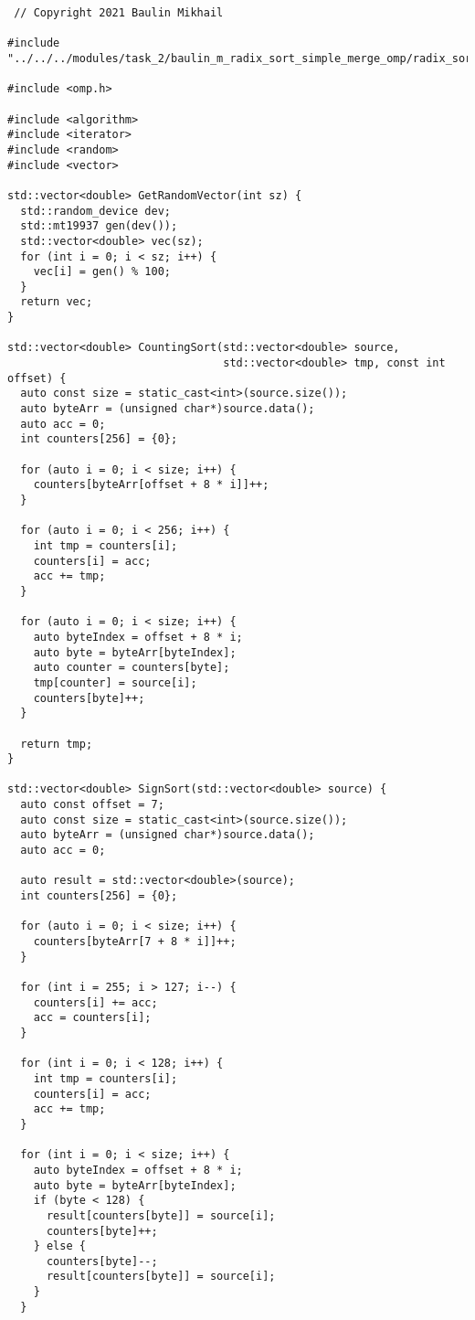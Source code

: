 \documentclass{report}
\begin{document}
    \begin{lstlisting}
 // Copyright 2021 Baulin Mikhail

#include "../../../modules/task_2/baulin_m_radix_sort_simple_merge_omp/radix_sort.h"

#include <omp.h>

#include <algorithm>
#include <iterator>
#include <random>
#include <vector>

std::vector<double> GetRandomVector(int sz) {
  std::random_device dev;
  std::mt19937 gen(dev());
  std::vector<double> vec(sz);
  for (int i = 0; i < sz; i++) {
    vec[i] = gen() % 100;
  }
  return vec;
}

std::vector<double> CountingSort(std::vector<double> source,
                                 std::vector<double> tmp, const int offset) {
  auto const size = static_cast<int>(source.size());
  auto byteArr = (unsigned char*)source.data();
  auto acc = 0;
  int counters[256] = {0};

  for (auto i = 0; i < size; i++) {
    counters[byteArr[offset + 8 * i]]++;
  }

  for (auto i = 0; i < 256; i++) {
    int tmp = counters[i];
    counters[i] = acc;
    acc += tmp;
  }

  for (auto i = 0; i < size; i++) {
    auto byteIndex = offset + 8 * i;
    auto byte = byteArr[byteIndex];
    auto counter = counters[byte];
    tmp[counter] = source[i];
    counters[byte]++;
  }

  return tmp;
}

std::vector<double> SignSort(std::vector<double> source) {
  auto const offset = 7;
  auto const size = static_cast<int>(source.size());
  auto byteArr = (unsigned char*)source.data();
  auto acc = 0;

  auto result = std::vector<double>(source);
  int counters[256] = {0};

  for (auto i = 0; i < size; i++) {
    counters[byteArr[7 + 8 * i]]++;
  }

  for (int i = 255; i > 127; i--) {
    counters[i] += acc;
    acc = counters[i];
  }

  for (int i = 0; i < 128; i++) {
    int tmp = counters[i];
    counters[i] = acc;
    acc += tmp;
  }

  for (int i = 0; i < size; i++) {
    auto byteIndex = offset + 8 * i;
    auto byte = byteArr[byteIndex];
    if (byte < 128) {
      result[counters[byte]] = source[i];
      counters[byte]++;
    } else {
      counters[byte]--;
      result[counters[byte]] = source[i];
    }
  }


\end{lstlisting}
\end{document}
